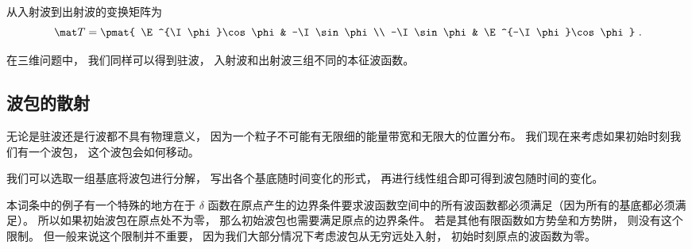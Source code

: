 从入射波到出射波的变换矩阵为
\begin{equation}
\mat T = \pmat{
\E^{\I\phi}\cos\phi & -\I \sin\phi \\
-\I \sin\phi & \E^{-\I\phi}\cos\phi
}~.\end{equation}

在三维问题中， 我们同样可以得到驻波， 入射波和出射波三组不同的本征波函数。

\subsection{波包的散射}
无论是驻波还是行波都不具有物理意义， 因为一个粒子不可能有无限细的能量带宽和无限大的位置分布。 我们现在来考虑如果初始时刻我们有一个波包， 这个波包会如何移动。

我们可以选取一组基底将波包进行分解， 写出各个基底随时间变化的形式， 再进行线性组合即可得到波包随时间的变化。

本词条中的例子有一个特殊的地方在于 $\delta$ 函数在原点产生的边界条件要求波函数空间中的所有波函数都必须满足（因为所有的基底都必须满足）。 所以如果初始波包在原点处不为零， 那么初始波包也需要满足原点的边界条件。 若是其他有限函数如方势垒和方势阱， 则没有这个限制。 但一般来说这个限制并不重要， 因为我们大部分情况下考虑波包从无穷远处入射， 初始时刻原点的波函数为零。


